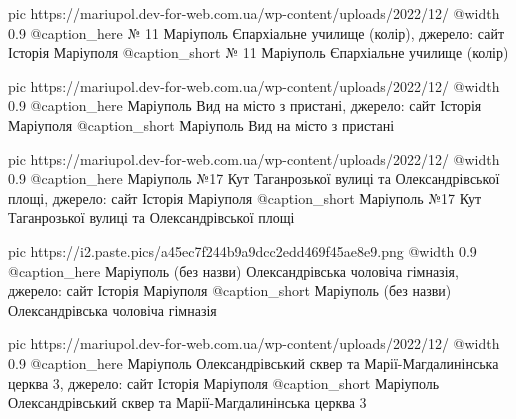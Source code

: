   pic https://mariupol.dev-for-web.com.ua/wp-content/uploads/2022/12/%
  @width 0.9
  @caption_here № 11 Маріуполь Єпархіальне училище (колір), джерело: сайт Історія Маріуполя
  @caption_short № 11 Маріуполь Єпархіальне училище (колір)

  pic https://mariupol.dev-for-web.com.ua/wp-content/uploads/2022/12/%
  @width 0.9
  @caption_here Маріуполь Вид на місто з пристані, джерело: сайт Історія Маріуполя
  @caption_short Маріуполь Вид на місто з пристані

  pic https://mariupol.dev-for-web.com.ua/wp-content/uploads/2022/12/%
  @width 0.9
  @caption_here Маріуполь №17 Кут Таганрозької вулиці та Олександрівської площі, джерело: сайт Історія Маріуполя
  @caption_short Маріуполь №17 Кут Таганрозької вулиці та Олександрівської площі

  pic https://i2.paste.pics/a45ec7f244b9a9dcc2edd469f45ae8e9.png
  @width 0.9
  @caption_here Маріуполь (без назви) Олександрівська чоловіча гімназія, джерело: сайт Історія Маріуполя
  @caption_short Маріуполь (без назви) Олександрівська чоловіча гімназія

  pic https://mariupol.dev-for-web.com.ua/wp-content/uploads/2022/12/%
  @width 0.9
  @caption_here Маріуполь Олександрівський сквер та Марії-Магдалинінська церква 3, джерело: сайт Історія Маріуполя
  @caption_short Маріуполь Олександрівський сквер та Марії-Магдалинінська церква 3

